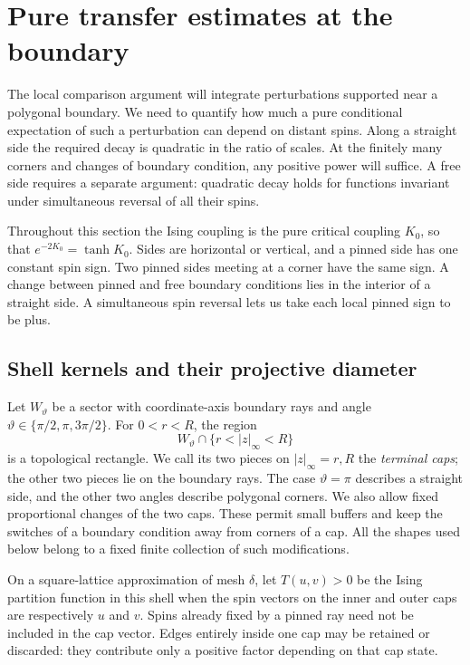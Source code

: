 \section{Pure transfer estimates at the boundary}
\label{sec:boundary}

The local comparison argument will integrate perturbations supported near a
polygonal boundary. We need to quantify how much a pure conditional
expectation of such a perturbation can depend on distant spins. Along a
straight side the required decay is quadratic in the ratio of scales. At
the finitely many corners and changes of boundary condition, any positive
power will suffice. A free side requires a separate argument: quadratic
decay holds for functions invariant under simultaneous reversal of all
their spins.

Throughout this section the Ising coupling is the pure critical coupling
$K_0$, so that $e^{-2K_0}=\tanh K_0$. Sides are horizontal or vertical,
and a pinned side has one constant spin sign. Two pinned sides meeting at
a corner have the same sign. A change between pinned and free boundary
conditions lies in the interior of a straight side. A simultaneous spin
reversal lets us take each local pinned sign to be plus.

\subsection{Shell kernels and their projective diameter}

Let $W_\vartheta$ be a sector with coordinate-axis boundary rays and angle
$\vartheta\in\{\pi/2,\pi,3\pi/2\}$. For $0<r<R$, the region
\[
  W_\vartheta\cap\{r<\lvert z\rvert_\infty<R\}
\]
is a topological rectangle. We call its two pieces on
$\lvert z\rvert_\infty=r,R$ the \emph{terminal caps}; the other two
pieces lie on the boundary rays. The case $\vartheta=\pi$ describes a
straight side, and the other two angles describe polygonal corners.
We also allow fixed proportional changes of the two caps. These permit
small buffers and keep the switches of a boundary condition away from
corners of a cap. All the shapes used below belong to a fixed finite
collection of such modifications.

On a square-lattice approximation of mesh $\delta$, let $T(u,v)>0$ be
the Ising partition function in this shell when the spin vectors on the
inner and outer caps are respectively $u$ and $v$. Spins already fixed
by a pinned ray need not be included in the cap vector. Edges entirely
inside one cap may be retained or discarded: they contribute only a
positive factor depending on that cap state.

